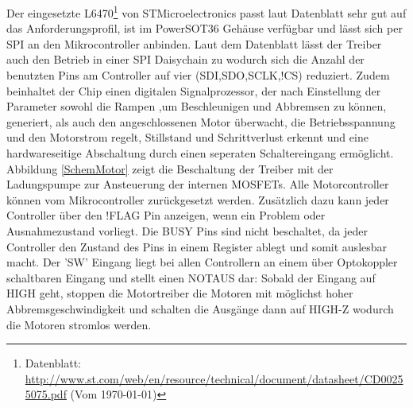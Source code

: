 \documentclass{scrartcl}
\begin{document}
Der eingesetzte L6470\footnote{Datenblatt: \url{http://www.st.com/web/en/resource/technical/document/datasheet/CD00255075.pdf} (Vom \today)} von STMicroelectronics passt laut Datenblatt sehr gut auf das Anforderungsprofil, ist im PowerSOT36 Gehäuse verfügbar und lässt sich per SPI an den Mikrocontroller anbinden. Laut dem Datenblatt lässt der Treiber auch den Betrieb in einer SPI Daisychain zu wodurch sich die Anzahl der benutzten Pins am Controller auf vier (SDI,SDO,SCLK,!CS) reduziert. Zudem beinhaltet der Chip einen digitalen Signalprozessor, der nach Einstellung der Parameter sowohl die Rampen ,um Beschleunigen und Abbremsen zu können, generiert, als auch den angeschlossenen Motor überwacht, die Betriebsspannung und den Motorstrom regelt, Stillstand und Schrittverlust erkennt und eine hardwareseitige Abschaltung durch einen seperaten Schaltereingang ermöglicht. Abbildung \ref{SchemMotor} zeigt die Beschaltung der Treiber mit der Ladungspumpe zur Ansteuerung der internen MOSFETs. Alle Motorcontroller können vom Mikrocontroller zurückgesetzt werden. Zusätzlich dazu kann jeder Controller über den !FLAG Pin anzeigen, wenn ein Problem oder Ausnahmezustand vorliegt. Die BUSY Pins sind nicht beschaltet, da jeder Controller den Zustand des Pins in einem Register ablegt und somit auslesbar macht. Der 'SW' Eingang liegt bei allen Controllern an einem über Optokoppler schaltbaren Eingang und stellt einen NOTAUS dar: Sobald der Eingang auf HIGH geht, stoppen die Motortreiber die Motoren mit möglichst hoher Abbremsgeschwindigkeit und schalten die Ausgänge dann auf HIGH-Z wodurch die Motoren stromlos werden.
\end{document}
